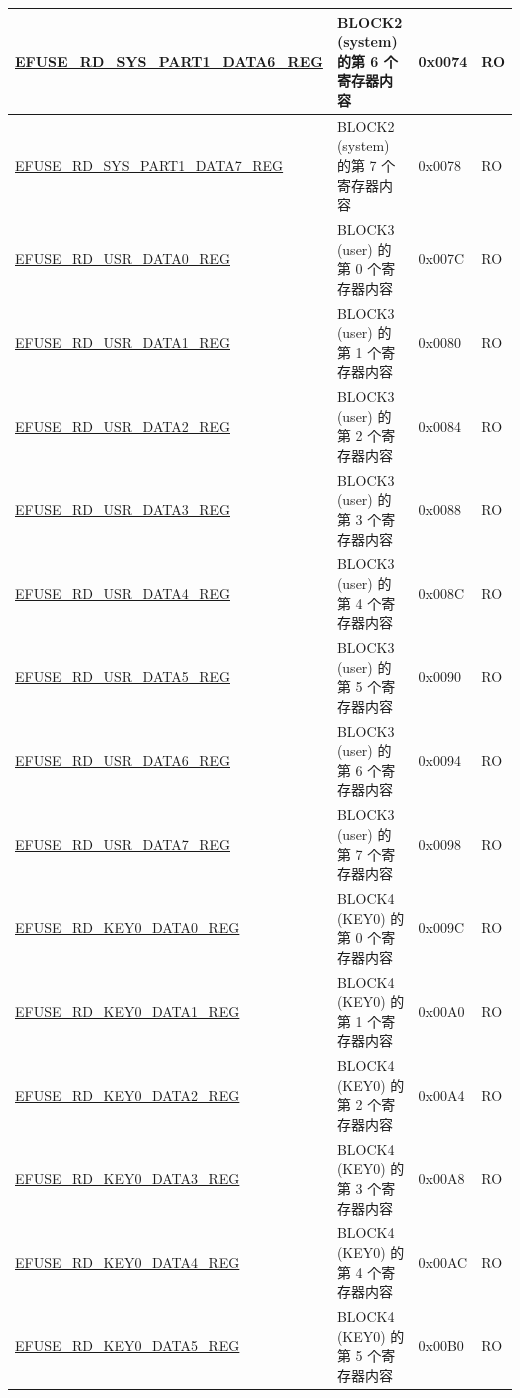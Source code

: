 \begin{longtable}{ | p{6cm} | p{7.2cm} | p{1.3cm} | p{1cm} | }
\hyperref[regdesc:EFUSERDSYSPART1DATA6REG]{EFUSE\_RD\_SYS\_PART1\_DATA6\_REG} & BLOCK2 (system) 的第 6 个寄存器内容  & 0x0074 & RO \\ \hline
\hyperref[regdesc:EFUSERDSYSPART1DATA7REG]{EFUSE\_RD\_SYS\_PART1\_DATA7\_REG} & BLOCK2 (system) 的第 7 个寄存器内容  & 0x0078 & RO \\ \hline
\hyperref[regdesc:EFUSERDUSRDATA0REG]{EFUSE\_RD\_USR\_DATA0\_REG} & BLOCK3 (user) 的第 0 个寄存器内容  & 0x007C & RO \\ \hline
\hyperref[regdesc:EFUSERDUSRDATA1REG]{EFUSE\_RD\_USR\_DATA1\_REG} & BLOCK3 (user) 的第 1 个寄存器内容  & 0x0080 & RO \\ \hline
\hyperref[regdesc:EFUSERDUSRDATA2REG]{EFUSE\_RD\_USR\_DATA2\_REG} & BLOCK3 (user) 的第 2 个寄存器内容  & 0x0084 & RO \\ \hline
\hyperref[regdesc:EFUSERDUSRDATA3REG]{EFUSE\_RD\_USR\_DATA3\_REG} & BLOCK3 (user) 的第 3 个寄存器内容  & 0x0088 & RO \\ \hline
\hyperref[regdesc:EFUSERDUSRDATA4REG]{EFUSE\_RD\_USR\_DATA4\_REG} & BLOCK3 (user) 的第 4 个寄存器内容  & 0x008C & RO \\ \hline
\hyperref[regdesc:EFUSERDUSRDATA5REG]{EFUSE\_RD\_USR\_DATA5\_REG} & BLOCK3 (user) 的第 5 个寄存器内容  & 0x0090 & RO \\ \hline
\hyperref[regdesc:EFUSERDUSRDATA6REG]{EFUSE\_RD\_USR\_DATA6\_REG} & BLOCK3 (user) 的第 6 个寄存器内容  & 0x0094 & RO \\ \hline
\hyperref[regdesc:EFUSERDUSRDATA7REG]{EFUSE\_RD\_USR\_DATA7\_REG} & BLOCK3 (user) 的第 7 个寄存器内容  & 0x0098 & RO \\ \hline
\hyperref[regdesc:EFUSERDKEY0DATA0REG]{EFUSE\_RD\_KEY0\_DATA0\_REG} & BLOCK4 (KEY0) 的第 0 个寄存器内容  & 0x009C & RO \\ \hline
\hyperref[regdesc:EFUSERDKEY0DATA1REG]{EFUSE\_RD\_KEY0\_DATA1\_REG} & BLOCK4 (KEY0) 的第 1 个寄存器内容  & 0x00A0 & RO \\ \hline
\hyperref[regdesc:EFUSERDKEY0DATA2REG]{EFUSE\_RD\_KEY0\_DATA2\_REG} & BLOCK4 (KEY0) 的第 2 个寄存器内容  & 0x00A4 & RO \\ \hline
\hyperref[regdesc:EFUSERDKEY0DATA3REG]{EFUSE\_RD\_KEY0\_DATA3\_REG} & BLOCK4 (KEY0) 的第 3 个寄存器内容  & 0x00A8 & RO \\ \hline
\hyperref[regdesc:EFUSERDKEY0DATA4REG]{EFUSE\_RD\_KEY0\_DATA4\_REG} & BLOCK4 (KEY0) 的第 4 个寄存器内容  & 0x00AC & RO \\ \hline
\hyperref[regdesc:EFUSERDKEY0DATA5REG]{EFUSE\_RD\_KEY0\_DATA5\_REG} & BLOCK4 (KEY0) 的第 5 个寄存器内容  & 0x00B0 & RO \\ \hline

\end{longtable}
